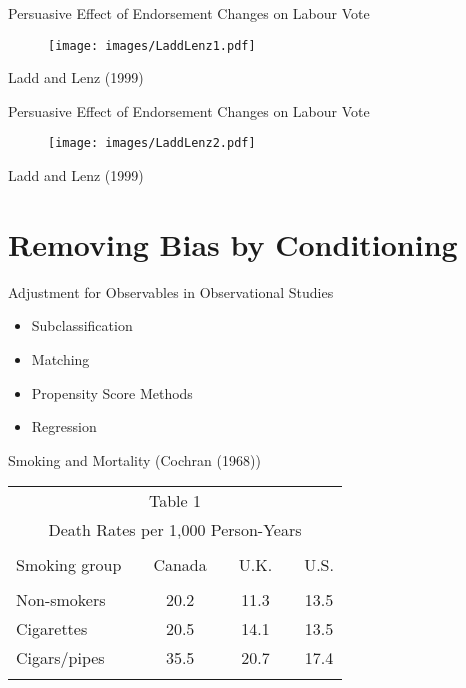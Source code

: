 \documentclass{beamer}
\numberwithin{equation}{section}
\begin{document}
\begin{frame}{Persuasive Effect of Endorsement Changes on Labour Vote}

\begin{figure}[ht] \centering
    \texttt{[image: images/LaddLenz1.pdf]}
\end{figure}

Ladd and Lenz (1999)

\end{frame}

\begin{frame}{Persuasive Effect of Endorsement Changes on Labour Vote}

\begin{figure}[ht] \centering
    \texttt{[image: images/LaddLenz2.pdf]}
\end{figure}

Ladd and Lenz (1999)

\end{frame}

\section{Removing Bias by
Conditioning}\label{removing-bias-by-conditioning}

\begin{frame}{Adjustment for Observables in Observational Studies}

\begin{itemize}
\itemsep1pt\parskip0pt
\item
  Subclassification\bigskip
\item
  Matching \bigskip
\item
  Propensity Score Methods\bigskip
\item
  Regression
\end{itemize}

\end{frame}

\begin{frame}{Smoking and Mortality (Cochran (1968))}

\begin{center}
 \begin{tabular}{lcccccc}
 \multicolumn{7}{c}{\small\sc Table 1}\\
 \multicolumn{7}{c}{\footnotesize\sc Death Rates per
 1,000 Person-Years}\vspace*{0.1cm}\\\hline\hline\\
 Smoking group&&Canada&&U.K.&&U.S.\\\hline\\
 Non-smokers&&20.2&&11.3&&13.5\\
 Cigarettes&&20.5&&14.1&&13.5\\
 Cigars/pipes&&35.5&&20.7&&17.4\\\hline\\
 \end{tabular}
\end{center}

\end{frame}
\end{document}
